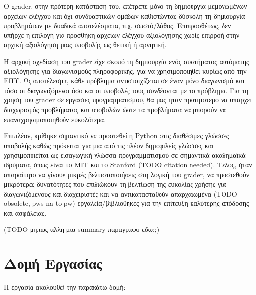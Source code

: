 \documentclass[diploma]{softlab-thesis}
\begin{document}
\bigskip

Ο grader, στην πρότερη κατάσταση του, επέτρεπε μόνο τη δημιουργία
μεμονωμένων αρχείων ελέγχου και όχι συνδυαστικών ομάδων καθιστώντας
δύσκολη τη δημιουργία προβλημάτων με δυαδικά αποτελέσματα, π.χ. σωστό/λάθος.
Επιπροσθέτως, δεν υπήρχε η επιλογή για προσθήκη αρχείων ελέγχου αξιολόγησης
χωρίς επιρροή στην αρχική αξιολόγηση μιας υποβολής ως θετική ή αρνητική.

\bigskip

Η αρχική σχεδίαση του grader είχε σκοπό τη δημιουργία ενός συστήματος αυτόματης
αξιολόγησης για διαγωνισμούς πληροφορικής, για να χρησιμοποιηθεί κυρίως από την
ΕΠΥ. Ως αποτέλεσμα, κάθε πρόβλημα αντιστοιχίζεται σε έναν μόνο διαγωνισμό και τόσο
οι διαγωνιζόμενοι όσο και οι υποβολές τους συνδέονται με το πρόβλημα. Για τη χρήση
του grader σε εργασίες προγραμματισμού, θα μας ήταν προτιμότερο να υπάρχει
διαχωρισμός προβλήματος και υποβολών ώστε τα προβλήματα να μπορούν να
επαναχρησιμοποιηθούν ευκολότερα.

\bigskip

Επιπλέον, κρίθηκε σημαντικό να προστεθεί η Python στις διαθέσιμες γλώσσες
υποβολής καθώς πρόκειται για μια από τις πλέον δημοφιλείς γλώσσες και
χρησιμοποιείται ως εισαγωγική γλώσσα προγραμματισμού σε σημαντικά ακαδημαϊκά
ιδρύματα, όπως είναι το MIT και το Stanford (TODO citation needed). Τέλος, ήταν
απαραίτητο να γίνουν μικρές βελτιστοποιήσεις στη λογική του grader, να
προστεθούν μικρότερες δυνατότητες που επιδιώκουν τη βελτίωση της ευκολίας
χρήσης για διαγωνιζόμενους και διαχειριστές και να αντικατασταθούν απαρχαιωμένα
(TODO obsolete, pws na to pw) εργαλεία/βιβλιοθήκες για την επίτευξη καλύτερης
απόδοσης και ασφάλειας.

\bigskip

(TODO μηπως αλλη μια summary παραγραφο εδω;;)

\newpage

\section{Δομή Εργασίας}

Η εργασία ακολουθεί την παρακάτω δομή:
\end{document}
